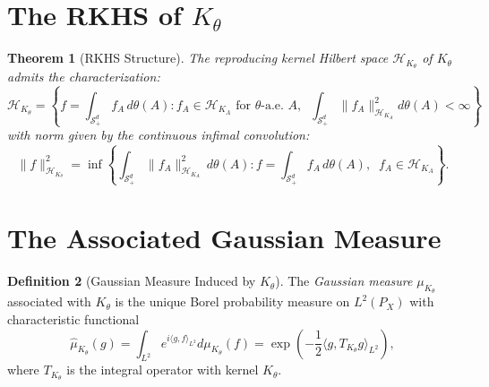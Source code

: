 \documentclass[11pt]{article}
\newtheorem{theorem}{Theorem}[section]
\theoremstyle{definition}
\newtheorem{definition}[theorem]{Definition}
\newcommand{\Splus}{\mathcal{S}_+^d}
\newcommand{\inprod}[2]{\langle #1, #2 \rangle}
\newcommand{\norm}[1]{\| #1 \|}
\begin{document}
\section{The RKHS of $K_\theta$}

\begin{theorem}[RKHS Structure]
\label{thm:rkhs}
The reproducing kernel Hilbert space $\mathcal{H}_{K_\theta}$ of $K_\theta$ admits the characterization:
\begin{equation}
    \mathcal{H}_{K_\theta} = \left\{ f = \int_{\Splus} f_A \, d\theta(A) : f_A \in \mathcal{H}_{K_A} \text{ for } \theta\text{-a.e. } A, \;\; \int_{\Splus} \norm{f_A}_{\mathcal{H}_{K_A}}^2 d\theta(A) < \infty \right\}
\end{equation}
with norm given by the \emph{continuous infimal convolution}:
\begin{equation}
    \boxed{
    \norm{f}_{\mathcal{H}_{K_\theta}}^2 = \inf \left\{ \int_{\Splus} \norm{f_A}_{\mathcal{H}_{K_A}}^2 \, d\theta(A) : f = \int_{\Splus} f_A \, d\theta(A), \;\; f_A \in \mathcal{H}_{K_A} \right\}.
    }
\end{equation}
\end{theorem}

\section{The Associated Gaussian Measure}

\begin{definition}[Gaussian Measure Induced by $K_\theta$]
\label{def:gp}
The \emph{Gaussian measure} $\mu_{K_\theta}$ associated with $K_\theta$ is the unique Borel probability measure on $L^2(P_X)$ with characteristic functional
\begin{equation}
    \hat{\mu}_{K_\theta}(g) = \int_{L^2} e^{i\inprod{g}{f}_{L^2}} d\mu_{K_\theta}(f) = \exp\left(-\frac{1}{2}\inprod{g}{T_{K_\theta} g}_{L^2}\right),
\end{equation}
where $T_{K_\theta}$ is the integral operator with kernel $K_\theta$.
\end{definition}
\end{document}
